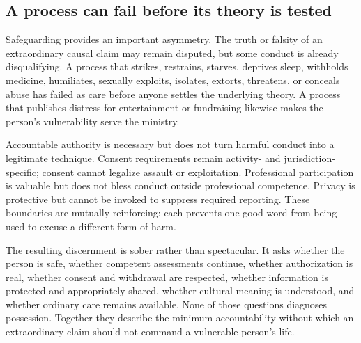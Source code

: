 \subsection{A process can fail before its theory is tested}

Safeguarding provides an important asymmetry. The truth or falsity of an
extraordinary causal claim may remain disputed, but some conduct is already
disqualifying. A process that strikes, restrains, starves, deprives sleep,
withholds medicine, humiliates, sexually exploits, isolates, extorts,
threatens, or conceals abuse has failed as care before anyone settles the
underlying theory. A process that publishes distress for entertainment or
fundraising likewise makes the person's vulnerability serve the ministry.

Accountable authority is necessary but does not turn harmful conduct into a
legitimate technique. Consent requirements remain activity- and
jurisdiction-specific; consent cannot legalize assault or exploitation.
Professional participation is valuable but
does not bless conduct outside professional competence. Privacy is protective
but cannot be invoked to suppress required reporting. These boundaries are
mutually reinforcing: each prevents one good word from being used to excuse a
different form of harm.

The resulting discernment is sober rather than spectacular. It asks whether
the person is safe, whether competent assessments continue, whether
authorization is real, whether consent and withdrawal are respected, whether
information is protected and appropriately shared, whether cultural meaning
is understood, and whether ordinary care remains available. None of those
questions diagnoses possession. Together they describe the minimum
accountability without which an extraordinary claim should not command a
vulnerable person's life.
